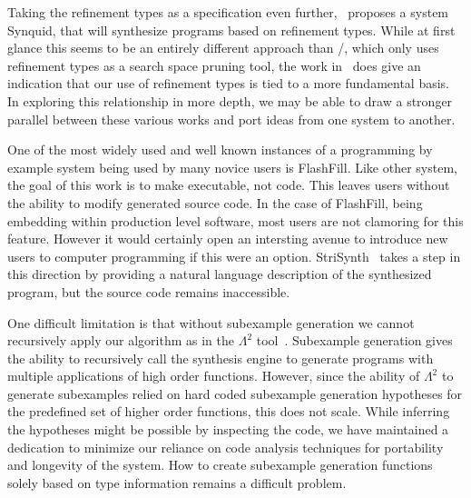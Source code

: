 Taking the refinement types as a specification even further,~\cite{dblp1683325} proposes a system Synquid, that will synthesize programs based on refinement types. While at first glance this seems to be an entirely different approach than \ourTool/, which only uses refinement types as a search space pruning tool, the work in~\cite{Osera:2016} does give an indication that our use of refinement types is tied to a more fundamental basis. In exploring this relationship in more depth, we may be able to draw a stronger parallel between these various works and port ideas from one system to another.

One of the most widely used and well known instances of a programming by example system being used by many novice users is FlashFill\cite{GulwaniHS12}. Like other system, the goal of this work is to make executable, not code. This leaves users without the ability to modify generated source code. In the case of FlashFill, being embedding within production level software, most users are not clamoring for this feature. However it would certainly open an intersting avenue to introduce new users to computer programming if this were an option. StriSynth~\cite{icse} takes a step in this direction by providing a natural language description of the synthesized program, but the source code remains inaccessible.

One difficult limitation is that without subexample generation we cannot recursively apply our algorithm as in the $\Lambda^2$ tool~\cite{Feser:2015}.
Subexample generation gives the ability to recursively call the synthesis engine to generate programs with multiple applications of high order functions.
However, since the ability of $\Lambda^2$ to generate subexamples relied on hard coded subexample generation hypotheses for the predefined set of higher order functions, this does not scale.
While inferring the hypotheses might be possible by inspecting the code, we have maintained a dedication to minimize our reliance on code analysis techniques for portability and longevity of the system. 
How to create subexample generation functions solely based on type information remains a difficult problem.
